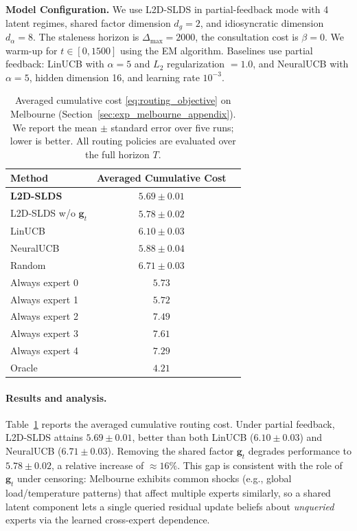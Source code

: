 \textbf{Model Configuration.}
We use L2D-SLDS in partial-feedback mode with 4 latent regimes, shared factor dimension
\(d_g=2\), and idiosyncratic dimension \(d_\alpha=8\). The staleness horizon is \(\Delta_{\max}=2000\), the consultation
cost is \(\beta=0\). We warm-up for $t \in [0,1500]$ using the EM algorithm. Baselines use partial feedback: LinUCB with \(\alpha=5\) and \(L_2\) regularization \(=1.0\), and NeuralUCB with
\(\alpha=5\), hidden dimension 16, and learning rate \(10^{-3}\).


\begin{table}[ht]
\centering
\small
\setlength{\tabcolsep}{4pt}
\caption{Averaged cumulative cost \eqref{eq:routing_objective} on Melbourne (Section~\ref{sec:exp_melbourne_appendix}).
We report the mean $\pm$ standard error over five runs; lower is better.
All routing policies are evaluated over the full horizon \(T\).}
\label{tab:exp_avg_costs_melbourne_appendix}
\begin{tabular}{@{}lcc@{}}
\toprule
Method & Averaged Cumulative Cost  \\
\midrule
\textbf{L2D-SLDS} & \(\mathbf{5.69 \pm 0.01}\)  \\
L2D-SLDS w/o \(\mathbf{g}_t\) & \(5.78 \pm 0.02\) \\
\midrule
LinUCB & \(6.10 \pm 0.03\)  \\
NeuralUCB & \(5.88 \pm 0.04\)  \\
Random & \(6.71 \pm 0.03\)  \\
Always expert 0 & \(5.73\)  \\
Always expert 1 & \(5.72\) \\
Always expert 2 & \(7.49\) \\
Always expert 3 & \(7.61\) \\
Always expert 4 & \(7.29\)  \\
Oracle & \(4.21\)  \\
\bottomrule
\end{tabular}
\end{table}

\paragraph{Results and analysis.}
Table~\ref{tab:exp_avg_costs_melbourne_appendix} reports the averaged cumulative routing cost. Under partial feedback, L2D-SLDS attains
\(5.69 \pm 0.01\), better than both LinUCB (\(6.10 \pm 0.03\)) and NeuralUCB (\(6.71 \pm 0.03\)). Removing the shared factor
\(\mathbf{g}_t\) degrades performance to \(5.78 \pm 0.02\), a relative increase of \(\approx 16\%\).
This gap is consistent with the role of \(\mathbf{g}_t\) under censoring: Melbourne exhibits common shocks (e.g., global
load/temperature patterns) that affect multiple experts similarly, so a shared latent component lets a single queried residual
update beliefs about \emph{unqueried} experts via the learned cross-expert dependence.

